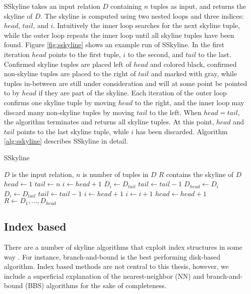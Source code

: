 \documentclass[12pt,a4paper,twoside]{report}
\begin{document}
SSkyline takes an input relation $D$ containing $n$ tuples as
input, and returns the skyline of $D$. The skyline is computed
using two nested loops and three indices: $head$, $tail$, and $i$.
Intuitively the inner loop searches for the next skyline tuple,
while the outer loop repeats the inner loop until all skyline
tuples have been found. Figure \ref{fig:sskyline} shows an
example run of SSkyline. In the first iteration $head$ points
to the first tuple, $i$ to the second, and $tail$ to the last.
Confirmed skyline tuples are placed left of $head$ and colored
black, confirmed non-skyline tuples are placed to the right of
$tail$ and marked with gray, while tuples in-between are still
under consideration and will at some point be pointed to by
$head$ if they are part of the skyline. Each iteration of the
outer loop confirms one skyline tuple by moving $head$ to the
right, and the inner loop may discard many non-skyline tuples
by moving $tail$ to the left. When $head = tail$, the
algorithm terminates and returns all skyline tuples. At this
point, $head$ and $tail$ points to the last skyline tuple,
while $i$ has been discarded. Algorithm \ref{alg:sskyline}
describes SSkyline in detail. 

\begin{algorithm}[H]
	\caption{SSkyline}
	\label{alg:sskyline}
	\begin{algorithmic}
		\Require
			$D$ is the input relation, 
			$n$ is number of tuples in $D$
		\Ensure $R$ contains the skyline of $D$
		\State $head \leftarrow 1$ 
		\State $tail \leftarrow n$ 
			\State $i \leftarrow head + 1$
					\State $D_i \leftarrow D_{tail}$
					\State $tail \leftarrow tail - 1$
					\State $D_{head} \leftarrow D_i$
					\State $D_i \leftarrow D_{tail}$
					\State $tail \leftarrow tail - 1$
					\State $i \leftarrow head + 1$
				\Else
					\State $i \leftarrow i + 1$
				\EndIf
			\EndWhile
			\State $head \leftarrow head + 1$
		\EndWhile
		\State $R \leftarrow D_1, \ldots, D_{head}$
	\end{algorithmic}
\end{algorithm}

\subsection{Index based}

There are a number of skyline algorithms that exploit index
structures in some way
\cite{tan2001efficient,papadias2003optimal,borzsony2001skyline,papadias2005progressive}.
For instance, branch-and-bound is the best performing disk-based
algorithm.  Index based methods are not central to this thesis,
however, we include a superficial explanation of the
nearest-neighbor (NN) and branch-and-bound (BBS) algorithms for
the sake of completeness.
\end{document}
